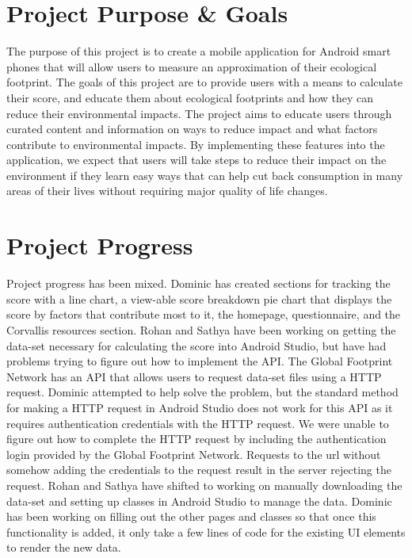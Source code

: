 \documentclass[onecolumn, draftclsnofoot,10pt, compsoc, tikz]{IEEEtran}
\begin{document}
\section{Project Purpose \& Goals}
The purpose of this project is to create a mobile application for Android smart phones that will allow users to measure an approximation of their ecological footprint. 
The goals of this project are to provide users with a means to calculate their score, and educate them about ecological footprints and how they can reduce their environmental impacts. The project aims to educate users through curated content and information on ways to reduce impact and what factors contribute to environmental impacts.
By implementing these features into the application, we expect that users will take steps to reduce their impact on the environment if they learn easy ways that can help cut back consumption in many areas of their lives without requiring major quality of life changes.

\section{Project Progress}
Project progress has been mixed. Dominic has created sections for tracking the score with a line chart, a view-able score breakdown pie chart that displays the score by factors that contribute most to it, the homepage, questionnaire, and the Corvallis resources section. Rohan and Sathya have been working on getting the data-set necessary for calculating the score into Android Studio, but have had problems trying to figure out how to implement the API. The Global Footprint Network has an API that allows users to request data-set files using a HTTP request. Dominic attempted to help solve the problem, but the standard method for making a HTTP request in Android Studio does not work for this API as it requires authentication credentials with the HTTP request. We were unable to figure out how to complete the HTTP request by including the authentication login provided by the Global Footprint Network. Requests to the url without somehow adding the credentials to the request result in the server rejecting the request. Rohan and Sathya have shifted to working on manually downloading the data-set and setting up classes in Android Studio to manage the data. Dominic has been working on filling out the other pages and classes so that once this functionality is added, it only take a few lines of code for the existing UI elements to render the new data.
\end{document}
